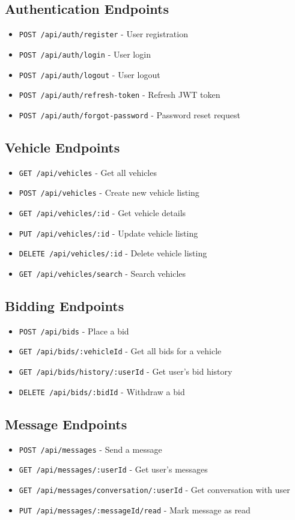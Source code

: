 \subsection{Authentication Endpoints}
\begin{itemize}
    \item \texttt{POST /api/auth/register} - User registration
    \item \texttt{POST /api/auth/login} - User login
    \item \texttt{POST /api/auth/logout} - User logout
    \item \texttt{POST /api/auth/refresh-token} - Refresh JWT token
    \item \texttt{POST /api/auth/forgot-password} - Password reset request
\end{itemize}

\subsection{Vehicle Endpoints}
\begin{itemize}
    \item \texttt{GET /api/vehicles} - Get all vehicles
    \item \texttt{POST /api/vehicles} - Create new vehicle listing
    \item \texttt{GET /api/vehicles/:id} - Get vehicle details
    \item \texttt{PUT /api/vehicles/:id} - Update vehicle listing
    \item \texttt{DELETE /api/vehicles/:id} - Delete vehicle listing
    \item \texttt{GET /api/vehicles/search} - Search vehicles
\end{itemize}

\subsection{Bidding Endpoints}
\begin{itemize}
    \item \texttt{POST /api/bids} - Place a bid
    \item \texttt{GET /api/bids/:vehicleId} - Get all bids for a vehicle
    \item \texttt{GET /api/bids/history/:userId} - Get user's bid history
    \item \texttt{DELETE /api/bids/:bidId} - Withdraw a bid
\end{itemize}

\subsection{Message Endpoints}
\begin{itemize}
    \item \texttt{POST /api/messages} - Send a message
    \item \texttt{GET /api/messages/:userId} - Get user's messages
    \item \texttt{GET /api/messages/conversation/:userId} - Get conversation with user
    \item \texttt{PUT /api/messages/:messageId/read} - Mark message as read
\end{itemize}

